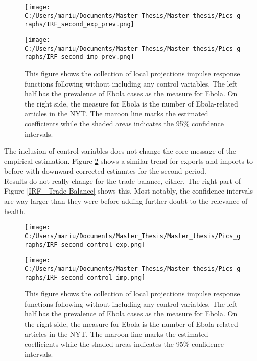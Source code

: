 \documentclass{article}
\begin{document}
\begin{figure}[!ht] 
\begin{minipage}[t]{0.5\linewidth}\vspace{0pt} 
\texttt{[image: C:/Users/mariu/Documents/Master\_Thesis/Master\_thesis/Pics\_graphs/IRF\_second\_exp\_prev.png]}\\
\end{minipage}\hfill%
\begin{minipage}[t]{0.5\linewidth}\vspace{0pt} 
\texttt{[image: C:/Users/mariu/Documents/Master\_Thesis/Master\_thesis/Pics\_graphs/IRF\_second\_imp\_prev.png]}\\
\end{minipage}\hfill%
\caption{This figure shows the collection of local projections impulse response functions following \cite{jorda2005estimation} without including any control variables. The left half has the prevalence of Ebola cases as the measure for Ebola. On the right side, the measure for Ebola is the number of Ebola-related articles in the NYT. The maroon line marks the estimated coefficients while the shaded areas indicates the 95\% confidence intervals.}
\label{Second Stage IRF - no controls}
\end{figure}

The inclusion of control variables does not change the core message of the empirical estimation. Figure \ref{Second Stage IRF - controls} shows a similar trend for exports and imports to before with downward-corrected estiamtes for the second period. \\
Results do not really change for the trade balance, either. The right part of Figure \ref{IRF - Trade Balance} shows this. Most notably, the confidence intervals are way larger than they were before adding further doubt to the relevance of health.

\begin{figure}[!ht] 
\begin{minipage}[t]{0.5\linewidth}\vspace{0pt} 
\texttt{[image: C:/Users/mariu/Documents/Master\_Thesis/Master\_thesis/Pics\_graphs/IRF\_second\_control\_exp.png]}\\
\end{minipage}\hfill%
\begin{minipage}[t]{0.5\linewidth}\vspace{0pt} 
\texttt{[image: C:/Users/mariu/Documents/Master\_Thesis/Master\_thesis/Pics\_graphs/IRF\_second\_control\_imp.png]}\\
\end{minipage}\hfill%
\caption{This figure shows the collection of local projections impulse response functions following \cite{jorda2005estimation} without including any control variables. The left half has the prevalence of Ebola cases as the measure for Ebola. On the right side, the measure for Ebola is the number of Ebola-related articles in the NYT. The maroon line marks the estimated coefficients while the shaded areas indicates the 95\% confidence intervals.}
\label{Second Stage IRF - controls}
\end{figure}
\end{document}
